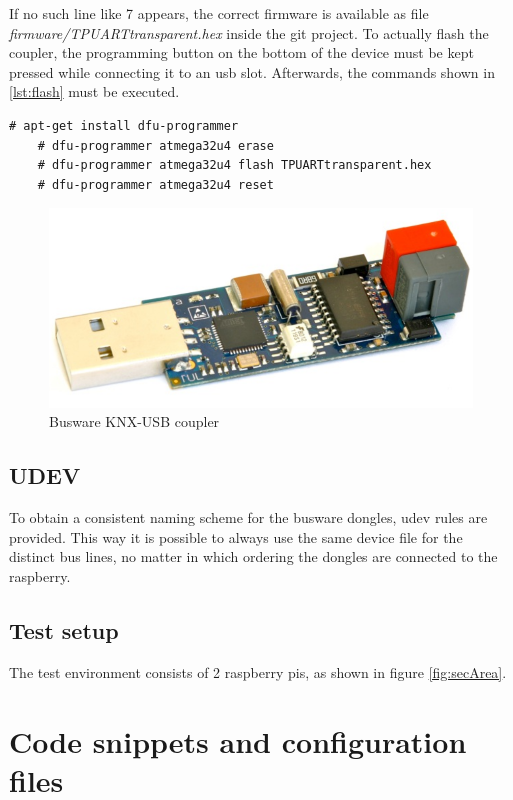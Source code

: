If no such line like 7 appears, the correct firmware is available as file \textit{firmware/TPUARTtransparent.hex} inside the git project. To actually flash the 
coupler, the programming button on the bottom of the device must be kept pressed while connecting it to an \gls{usb} slot. Afterwards, the commands shown
in \ref{lst:flash} must be executed.

\begin{lstlisting}[style=BashInputStyle,label=lst:flash]
    # apt-get install dfu-programmer
    # dfu-programmer atmega32u4 erase
    # dfu-programmer atmega32u4 flash TPUARTtransparent.hex
    # dfu-programmer atmega32u4 reset
\end{lstlisting}


\begin{figure}
    \centering
    \caption{Busware KNX-USB coupler}
    \label{fig:busware}
\includegraphics[scale=0.2]{figures/busware.png}
\end{figure}

\section{UDEV}

To obtain a consistent naming scheme for the busware dongles, udev rules are provided. This way it is possible to always use the same
device file for the distinct bus lines, no matter in which ordering the dongles are connected to the raspberry.

\section{Test setup}

The test environment consists of 2 raspberry pis, as shown in figure \ref{fig:secArea}. 

\chapter{Code snippets and configuration files}

